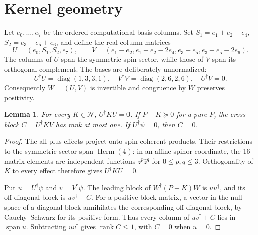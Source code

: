 \documentclass[aps,pra,reprint,onecolumn,superscriptaddress]{revtex4-2}
\newcommand{\NN}{\mathcal N}
\newcommand{\rank}{\operatorname{rank}}
\newcommand{\PSD}{\succeq0}
\newtheorem{lemma}{Lemma}
\begin{document}
\section{Kernel geometry}

Let \(e_0,\ldots,e_7\) be the ordered computational-basis columns. Set \(S_1=e_1+e_2+e_4\), \(S_2=e_3+e_5+e_6\), and define the real column matrices
\begin{equation}
 U=(e_0,S_1,S_2,e_7),\qquad
 V=(e_1-e_2,e_1+e_2-2e_4,e_3-e_5,e_3+e_5-2e_6).
 \label{eq:UV}
\end{equation}
The columns of \(U\) span the symmetric-spin sector, while those of \(V\) span its orthogonal complement. The bases are deliberately unnormalized:
\begin{equation}
 U^\dagger U=\operatorname{diag}(1,3,3,1),\quad
 V^\dagger V=\operatorname{diag}(2,6,2,6),\quad U^\dagger V=0.
 \label{eq:Gram}
\end{equation}
Consequently \(W=(U,V)\) is invertible and congruence by \(W\) preserves positivity.

\begin{lemma}\label{lem:block}
For every \(K\in\NN\), \(U^\dagger K U=0\). If \(P+K\PSD\) for a pure \(P\), the cross block \(C=U^\dagger K V\) has rank at most one. If \(U^\dagger\psi=0\), then \(C=0\).
\end{lemma}
\begin{proof}
The all-plus effects project onto spin-coherent products. Their restrictions to the symmetric sector span \(\operatorname{Herm}(4)\): in an affine spinor coordinate, the 16 matrix elements are independent functions \(z^p\bar z^q\) for \(0\le p,q\le3\). Orthogonality of \(K\) to every effect therefore gives \(U^\dagger K U=0\).

Put \(u=U^\dagger\psi\) and \(v=V^\dagger\psi\). The leading block of \(W^\dagger(P+K)W\) is \(uu^\dagger\), and its off-diagonal block is \(uv^\dagger+C\). For a positive block matrix, a vector in the null space of a diagonal block annihilates the corresponding off-diagonal block, by Cauchy--Schwarz for its positive form. Thus every column of \(uv^\dagger+C\) lies in \(\operatorname{span}u\). Subtracting \(uv^\dagger\) gives \(\rank C\le1\), with \(C=0\) when \(u=0\).
\end{proof}
\end{document}
